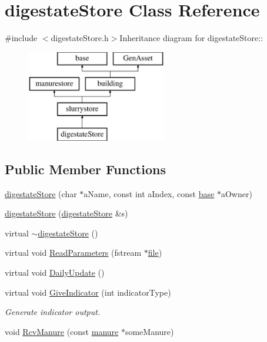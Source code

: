 \hypertarget{classdigestate_store}{
\section{digestateStore Class Reference}
\label{classdigestate_store}
}


{\ttfamily \#include $<$digestateStore.h$>$}Inheritance diagram for digestateStore::\begin{figure}[H]
\begin{center}
\leavevmode
\includegraphics[height=4cm]{classdigestate_store}
\end{center}
\end{figure}
\subsection*{Public Member Functions}
\begin{DoxyCompactItemize}
\item 
\hyperlink{classdigestate_store_ac64748835b5217088a548eac36df37b9}{digestateStore} (char $\ast$aName, const int aIndex, const \hyperlink{classbase}{base} $\ast$aOwner)
\item 
\hyperlink{classdigestate_store_ae72cb0da7e28d9b0c9c46cfca42cc7fd}{digestateStore} (\hyperlink{classdigestate_store}{digestateStore} \&s)
\item 
virtual \hyperlink{classdigestate_store_a61a67d4df48d66416fbabb1941075329}{$\sim$digestateStore} ()
\item 
virtual void \hyperlink{classdigestate_store_a93cdf55c94956f5e817ad386ea0c2a4b}{ReadParameters} (fstream $\ast$\hyperlink{classbase_a3af52ee9891719d09b8b19b42450b6f6}{file})
\item 
virtual void \hyperlink{classdigestate_store_a209611f25ea14ad07c9de42fa46eea05}{DailyUpdate} ()
\item 
virtual void \hyperlink{classdigestate_store_ae1402687e7bf67b150bf01e97c4798b9}{GiveIndicator} (int indicatorType)
\begin{DoxyCompactList}\small\item\em Generate indicator output. \item\end{DoxyCompactList}\item 
void \hyperlink{classdigestate_store_a840cf55a8a893f089c8c39a36cc3defe}{RcvManure} (const \hyperlink{classmanure}{manure} $\ast$someManure)
\end{DoxyCompactItemize}
